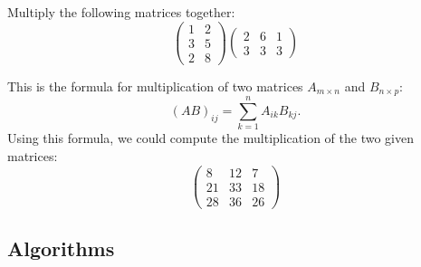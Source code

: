 \begin{question}
Multiply the following matrices together:
\[ \left( \begin{array}{cc}
1 & 2 \\
3 & 5 \\
2 & 8
\end{array} \right)
%
\left( \begin{array}{ccc}
2 & 6 & 1 \\
3 & 3 & 3
\end{array} \right)
\]
\begin{solution}
\end{solution}
This is the formula for multiplication of two matrices $A_{m \times n}$ and $B_{n \times p}$:
\[
    (AB)_{ij} = \sum_{k=1}^n A_{ik}B_{kj}. 
\]
Using this formula, we could compute the multiplication of the two given matrices:
\[
\begin{pmatrix}
8 & 12 & 7 \\
21 & 33 & 18 \\
28 & 36 & 26
\end{pmatrix}
\]
\end{question}

\subsection*{Algorithms}

